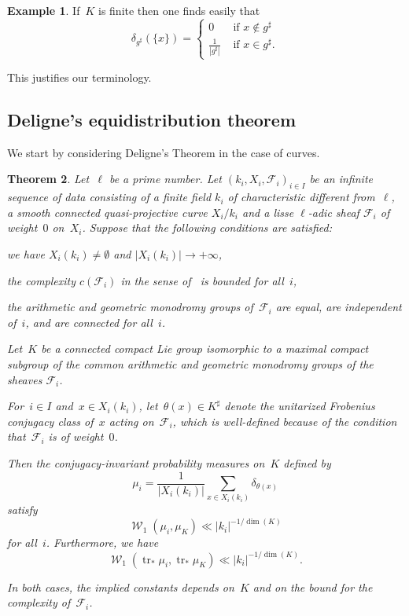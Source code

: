 \documentclass[12pt]{amsart}
\renewcommand{\mathcal}{\mathscr}
\DeclareMathOperator{\wass}{\mathcal{W}}
\DeclareMathOperator{\Tr}{tr}
\theoremstyle{plain}
\newtheorem{theorem}{Theorem}[section]
\theoremstyle{remark}
\theoremstyle{definition}
\newtheorem{example}[theorem]{Example}
\begin{document}
\begin{example}
  If~$K$ is finite then one finds easily that
  \[
    \delta_{g^{\sharp}}(\{x\})=\begin{cases}
      0&\text{ if } x\notin g^{\sharp}\\
      \frac{1}{|g^{\sharp}|}&\text{ if } x\in g^{\sharp}.
    \end{cases}
  \]

  This justifies our terminology.
\end{example}

\subsection{Deligne's equidistribution theorem}

We start by considering Deligne's Theorem in the case of curves.

\begin{theorem}\label{th-deligne}
  Let~$\ell$ be a prime number.  Let
  $(k_i,X_i,\mathcal{F}_i)_{i\in I}$ be an infinite sequence of data
  consisting of a finite field $k_i$ of characteristic different
  from~$\ell$, a smooth connected quasi-projective curve $X_i/k_i$ and
  a lisse $\ell$-adic sheaf $\mathcal{F}_i$ of weight~$0$
  on~$X_i$. Suppose that the following conditions are satisfied:
  \begin{enumth}
  \item we have $X_i(k_i)\not=\emptyset$ and $|X_i(k_i)|\to +\infty$,
  \item the complexity $c(\mathcal{F}_i)$ in the sense
    of~\cite[Def.\,3.2]{sffk} is bounded for all~$i$,
  \item the arithmetic and geometric monodromy groups
    of~$\mathcal{F}_i$ are equal, are independent of~$i$, and are
    connected for all~$i$.
  \end{enumth}

  Let~$K$ be a connected compact Lie group isomorphic to a maximal
  compact subgroup of the common arithmetic and geometric monodromy
  groups of the sheaves $\mathcal{F}_i$.

  For~$i\in I$ and~$x\in X_i(k_i)$, let~$\theta(x)\in K^{\sharp}$
  denote the unitarized Frobenius conjugacy class of~$x$ acting
  on~$\mathcal{F}_i$, which is well-defined because of the condition
  that~$\mathcal{F}_i$ is of weight~$0$.

  Then the conjugacy-invariant probability measures on~$K$ defined by
  \[
    \mu_i=\frac{1}{|X_i(k_i)|}
    \sum_{x\in X_i(k_i)}\delta_{\theta(x)}
  \]
  satisfy
  \begin{equation}\label{eq-wass-conj-class}
    \wass_1(\mu_i,\mu_K)\ll |k_i|^{-1/\dim(K)}
  \end{equation}
  for all~$i$. Furthermore, we have
  \begin{equation}\label{eq-wass-exp-sums}
    \wass_1(\Tr_*\mu_i,\Tr_*\mu_K)\ll |k_i|^{-1/\dim(K)}.
  \end{equation}
  
  In both cases, the implied constants depends on~$K$ and on the bound
  for the complexity of~$\mathcal{F}_i$.
\end{theorem}
\end{document}
